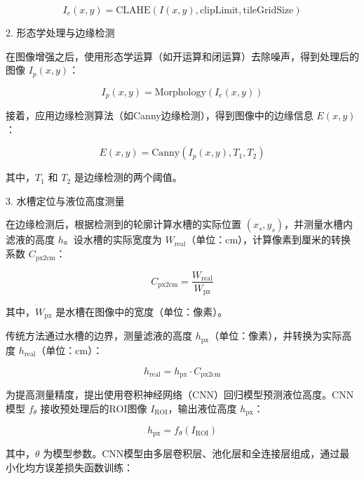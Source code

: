 \documentclass[UTF8,a4paper,fontset=none]{ctexart}
\begin{document}
\begin{equation}
I_e(x, y) = \text{CLAHE}(I(x, y), \text{clipLimit}, \text{tileGridSize})
\end{equation}

2. 形态学处理与边缘检测

在图像增强之后，使用形态学运算（如开运算和闭运算）去除噪声\textsuperscript{\cite{ref19}}，得到处理后的图像 \( I_p(x, y) \)：

\begin{equation}
I_p(x, y) = \text{Morphology}(I_e(x, y))
\end{equation}

接着，应用边缘检测算法\textsuperscript{\cite{ref16,ref17}}（如Canny边缘检测），得到图像中的边缘信息 \( E(x, y) \)：

\begin{equation}
E(x, y) = \text{Canny}(I_p(x, y), T_1, T_2)
\end{equation}

其中，\( T_1 \) 和 \( T_2 \) 是边缘检测的两个阈值。

3. 水槽定位与液位高度测量

在边缘检测后，根据检测到的轮廓计算水槽的实际位置 \( (x_s, y_s) \)，并测量水槽内滤液的高度 \( h \)。设水槽的实际宽度为 \( W_{\text{real}} \)（单位：cm），计算像素到厘米的转换系数 \( C_{\text{px2cm}} \)：

\begin{equation}
C_{\text{px2cm}} = \frac{W_{\text{real}}}{W_{\text{px}}}
\end{equation}

其中，\( W_{\text{px}} \) 是水槽在图像中的宽度（单位：像素）。

传统方法通过水槽的边界，测量滤液的高度 \( h_{\text{px}} \)（单位：像素），并转换为实际高度 \( h_{\text{real}} \)（单位：cm）：

\begin{equation}
h_{\text{real}} = h_{\text{px}} \cdot C_{\text{px2cm}}
\end{equation}

为提高测量精度，提出使用卷积神经网络\textsuperscript{\cite{ref20,ref21}}（CNN）回归模型预测液位高度。CNN模型 \( f_{\theta} \) 接收预处理后的ROI图像 \( I_{\text{ROI}} \)，输出液位高度 \( h_{\text{px}} \)：

\begin{equation}
h_{\text{px}} = f_{\theta}(I_{\text{ROI}})
\end{equation}

其中，\( \theta \) 为模型参数。CNN模型由多层卷积层、池化层和全连接层组成，通过最小化均方误差损失函数训练：
\end{document}
